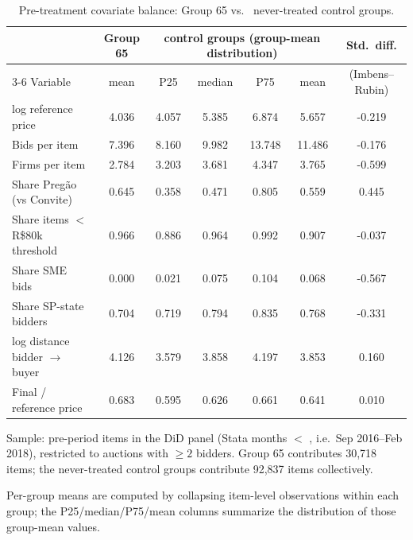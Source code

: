 \begin{table}[!htbp]
\centering
\begin{threeparttable}
\caption{Pre-treatment covariate balance: Group 65 vs.\ \balanceNCtrlGroups{} never-treated control groups.}
\label{tab:balance_pretreat}
\footnotesize
\setlength{\tabcolsep}{4pt}
\begin{tabular}{l c cccc c}
\toprule
 & \textbf{Group 65} & \multicolumn{4}{c}{\textbf{\balanceNCtrlGroups{} control groups (group-mean distribution)}} & \textbf{Std.\ diff.}\tnote{a} \\
\cmidrule(lr){3-6}
Variable & mean & P25 & median & P75 & mean & (Imbens--Rubin) \\
\midrule
log reference price & 4.036 & 4.057 & 5.385 & 6.874 & 5.657 & -0.219 \\
Bids per item & 7.396 & 8.160 & 9.982 & 13.748 & 11.486 & -0.176 \\
Firms per item & 2.784 & 3.203 & 3.681 & 4.347 & 3.765 & -0.599 \\
Share Preg\~ao (vs Convite) & 0.645 & 0.358 & 0.471 & 0.805 & 0.559 & 0.445 \\
Share items $<$ R\$80k threshold & 0.966 & 0.886 & 0.964 & 0.992 & 0.907 & -0.037 \\
Share SME bids & 0.000 & 0.021 & 0.075 & 0.104 & 0.068 & -0.567 \\
Share SP-state bidders & 0.704 & 0.719 & 0.794 & 0.835 & 0.768 & -0.331 \\
log distance bidder $\to$ buyer & 4.126 & 3.579 & 3.858 & 4.197 & 3.853 & 0.160 \\
Final / reference price & 0.683 & 0.595 & 0.626 & 0.661 & 0.641 & 0.010 \\
\bottomrule
\end{tabular}
\begin{tablenotes}\footnotesize
\item Sample: pre-period items in the DiD panel (Stata months $<$ \dataOcCutoff, i.e.\ Sep 2016--Feb 2018), restricted to auctions with $\ge 2$ bidders. Group 65 contributes 30,718 items; the \balanceNCtrlGroups{} never-treated control groups contribute 92,837 items collectively.
\item Per-group means are computed by collapsing item-level observations within each group; the P25/median/P75/mean columns summarize the distribution of those \balanceNCtrlGroups{} group-mean values.

\end{tablenotes}
\end{threeparttable}
\end{table}
